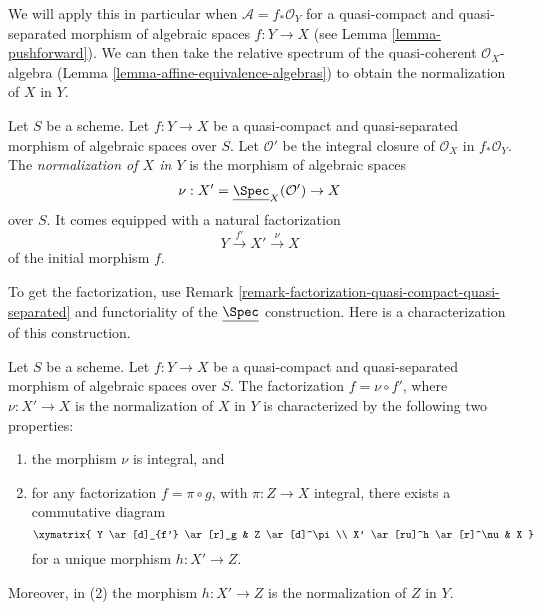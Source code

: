 \noindent
We will apply this in particular when $\mathcal{A} = f_*\mathcal{O}_Y$
for a quasi-compact and quasi-separated morphism of algebraic spaces
$f : Y \to X$ (see Lemma \ref{lemma-pushforward}). We can then take
the relative spectrum of the quasi-coherent $\mathcal{O}_X$-algebra
(Lemma \ref{lemma-affine-equivalence-algebras}) to obtain the
normalization of $X$ in $Y$.

\begin{definition}
\label{definition-normalization-X-in-Y}
Let $S$ be a scheme. Let $f : Y \to X$ be a quasi-compact and quasi-separated
morphism of algebraic spaces over $S$.
Let $\mathcal{O}'$ be the integral closure of $\mathcal{O}_X$ in
$f_*\mathcal{O}_Y$. The {\it normalization of $X$ in $Y$} is the
morphism of algebraic spaces
$$
\nu : X' = \underline{\Spec}_X(\mathcal{O}') \to X
$$
over $S$. It comes equipped with a natural factorization
$$
Y \xrightarrow{f'} X' \xrightarrow{\nu} X
$$
of the initial morphism $f$.
\end{definition}

\noindent
To get the factorization, use Remark
\ref{remark-factorization-quasi-compact-quasi-separated}
and functoriality of the $\underline{\Spec}$ construction.
Here is a characterization of this construction.

\begin{lemma}
\label{lemma-characterize-normalization}
Let $S$ be a scheme. Let $f : Y \to X$ be a quasi-compact and quasi-separated
morphism of algebraic spaces over $S$. The factorization $f = \nu \circ f'$,
where $\nu : X' \to X$ is the normalization of $X$ in $Y$ is characterized
by the following two properties:
\begin{enumerate}
\item the morphism $\nu$ is integral, and
\item for any factorization $f = \pi \circ g$, with $\pi : Z \to X$
integral, there exists a commutative diagram
$$
\xymatrix{
Y \ar[d]_{f'} \ar[r]_g & Z \ar[d]^\pi \\
X' \ar[ru]^h \ar[r]^\nu & X
}
$$
for a unique morphism $h : X' \to Z$.
\end{enumerate}
Moreover, in (2) the morphism $h : X' \to Z$ is the normalization of
$Z$ in $Y$.
\end{lemma}

